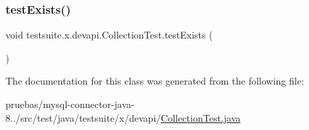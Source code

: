 \mbox{\label{classtestsuite_1_1x_1_1devapi_1_1_collection_test_acf8ab67b83a44279bfa89d3b2b718545}} 
\subsubsection{\texorpdfstring{test\+Exists()}{testExists()}}
{\footnotesize\ttfamily void testsuite.\+x.\+devapi.\+Collection\+Test.\+test\+Exists (\begin{DoxyParamCaption}{ }\end{DoxyParamCaption})}



The documentation for this class was generated from the following file\+:\begin{DoxyCompactItemize}
\item 
pruebas/mysql-\/connector-\/java-\/8../src/test/java/testsuite/x/devapi/\mbox{\hyperlink{_collection_test_8java}{Collection\+Test.\+java}}\end{DoxyCompactItemize}
